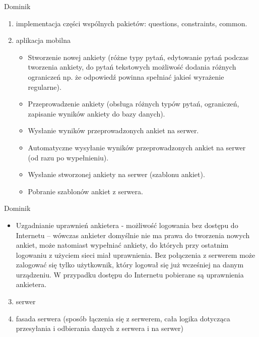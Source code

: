 \documentclass[a4paper,10pt]{beamer}
\begin{document}
		\begin{frame}{Dominik}
			\begin{enumerate}
				\item	implementacja części wspólnych pakietów: questions, constraints, common.
				\item	aplikacja mobilna
				\begin{itemize}
					\item Stworzenie nowej ankiety (różne typy pytań, edytowanie pytań podczas tworzenia ankiety, do pytań tekstowych możliwość dodania różnych ograniczeń np. że odpowiedź powinna spełniać jakieś wyrażenie regularne).
					\item	Przeprowadzenie ankiety (obsługa różnych typów pytań, ograniczeń, zapisanie wyników ankiety do bazy danych).
					\item	Wysłanie wyników przeprowadzonych ankiet na serwer.
					\item	Automatyczne wysyłanie wyników przeprowadzonych ankiet na serwer (od razu po wypełnieniu).
					\item	Wysłanie stworzonej ankiety na serwer (szablonu ankiet).
					\item	Pobranie szablonów ankiet z serwera.
				\end{itemize}
			\end{enumerate}
		\end{frame}
		\begin{frame}{Dominik}
				\begin{itemize}
					\item	Uzgadnianie uprawnień ankietera - możliwość logowania bez dostępu do Internetu – wówczas ankieter domyślnie nie ma prawa do tworzenia nowych ankiet, może natomiast wypełniać ankiety, do których przy ostatnim logowaniu z użyciem sieci miał uprawnienia. Bez połączenia z serwerem może zalogować się tylko użytkownik, który logował się już wcześniej na danym urządzeniu.  W przypadku dostępu do Internetu pobierane są uprawnienia ankietera.
				\end{itemize}
		\begin{enumerate}
			\setcounter{enumi}{2}	
				\item	serwer
				\item	fasada serwera (sposób łączenia się z serwerem, cała logika dotycząca przesyłania i odbierania danych z serwera i na serwer)
		\end{enumerate}
		\end{frame}
\end{document}
